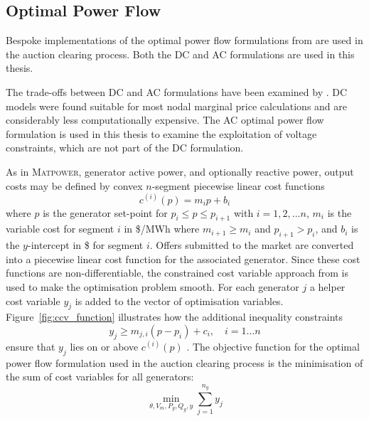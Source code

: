 \subsection{Optimal Power Flow}
\label{sec:pw_linear}
Bespoke implementations of the optimal power flow formulations from \matpower
are used in the auction clearing process.  Both the DC and AC formulations are
used in this thesis.

The trade-offs between DC and AC formulations have been examined by
.  DC models were found suitable for most nodal marginal
price calculations and are considerably less computationally expensive.  The
AC optimal power flow formulation is used in this thesis to examine the
exploitation of voltage constraints, which are not part of the DC formulation.

%

As in \textsc{Matpower}, generator active
power, and optionally reactive power, output costs may be defined by convex
$n$-segment piecewise linear cost functions
\begin{equation}
c^{(i)}(p) = m_ip + b_i
\end{equation}
where $p$ is the generator set-point for $p_i \leq p \leq p_{i+1}$ with
$i = 1,2,\dotsc n$, $m_i$ is the variable cost for segment $i$ in
\$/MWh where $m_{i+1} \geq m_i$ and $p_{i+1} > p_i$, and $b_i$ is the
$y$-intercept in \$ for segment $i$.  Offers submitted to the market are
converted into a piecewise linear cost function for the associated generator.
Since these cost functions are non-differentiable, the constrained cost
variable approach from  is used to make the optimisation
problem smooth.  For each generator $j$ a helper cost variable $y_j$ is added
to the vector of optimisation variables.  Figure~\ref{fig:ccv_function}
illustrates how the additional inequality constraints
\begin{equation}
y_j \geq m_{j,i}(p-p_i) + c_i, \quad i = 1\dotsc n
\end{equation}
ensure that $y_j$ lies on or above $c^{(i)}(p)$
\cite[Figure5-3]{pserc:mp_manual}.  The objective function for the optimal
power flow formulation used in the auction clearing process is the minimisation
of the sum of cost variables for all generators:
\begin{equation}
\min_{\theta, V_m, P_g, Q_g, y} \sum_{j=1}^{n_g}y_j
\end{equation}


